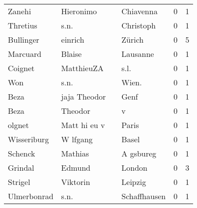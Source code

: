 \begin{tabular}{llllrr}
                   Zanehi &                          Hieronimo &             &                                   Chiavenna &          0 &         1 \\
                 Thretius &                               s.n. &             &                                   Christoph &          0 &         1 \\
                Bullinger &                            einrich &             &                                      Zürich &          0 &         5 \\
                 Marcuard &                             Blaise &             &                                    Lausanne &          0 &         1 \\
                  Coignet &                         MatthieuZA &             &                                        s.l. &          0 &         1 \\
                      Won &                               s.n. &             &                                      Wien.  &          0 &         1 \\
                     Beza &                       jaja Theodor &             &                                        Genf &          0 &         1 \\
                     Beza &                            Theodor &             &                                           v &          0 &         1 \\
                   olgnet &                       Matt hi eu v &             &                                       Paris &          0 &         1 \\
              Wisseriburg &                           W lfgang &             &                                       Basel &          0 &         1 \\
                  Schenck &                            Mathias &             &                                   A gsbureg &          0 &         1 \\
                  Grindal &                             Edmund &             &                                      London &          0 &         3 \\
                  Strigel &                           Viktorin &             &                                     Leipzig &          0 &         1 \\
              Ulmerbonrad &                               s.n. &             &                                Schaffhausen &          0 &         1 \\

\end{tabular}
